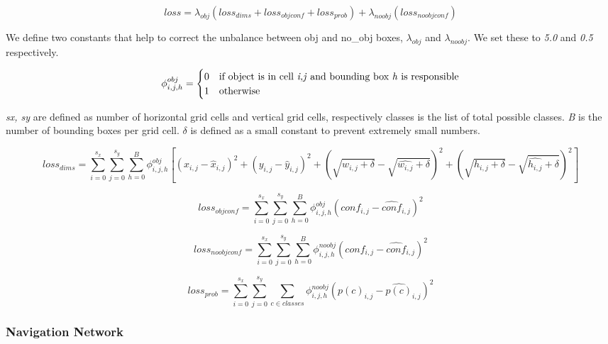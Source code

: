 \documentclass{article}
\begin{document}
\begin{equation}
loss = \lambda_{obj}(loss_{dims} + loss_{objconf}  + loss_{prob}) + \lambda_{noobj}(loss_{noobjconf})
\end{equation} 

We define two constants that help to correct the unbalance between obj and no\_obj boxes, $\lambda_{obj}$ and $\lambda_{noobj}$. We set these to \textit{5.0} and \textit{0.5} respectively.

\begin{equation}
\phi_{i,j,h}^{obj} =
\begin{cases}
0 & \text{if object is in cell \textit{i,j} and bounding box \textit{h} is responsible} \\
1 & \text{otherwise}
\end{cases}
\end{equation}

\textit{sx, sy} are defined as number of horizontal grid cells and vertical grid cells, respectively classes is the list of total possible classes. \textit{B} is the number of bounding boxes per grid cell. $\delta$ is defined as a small constant to prevent extremely small numbers.

\begin{equation}
loss_{dims} = \sum\limits_{i=0}^{s_x}\sum\limits_{j=0}^{s_y}\sum\limits_{h=0}^{B}\phi_{i,j,h}^{obj}[(x_{i,j} - \hat{x}_{i,j})^2 + (y_{i,j} - \hat{y}_{i,j})^2 + (\sqrt{w_{i,j} + \delta} - \sqrt{\hat{w_{i,j}} + \delta})^2 + (\sqrt{h_{i,j} + \delta} - \sqrt{\hat{h_{i,j}} + \delta})^2]
\end{equation}

\begin{equation}
loss_{objconf} = \sum\limits_{i=0}^{s_x}\sum\limits_{j=0}^{s_y}\sum\limits_{h=0}^{B}\phi_{i,j,h}^{obj}(conf_{i,j} - \hat{conf}_{i,j})^2
\end{equation}

\begin{equation}
loss_{noobjconf} = \sum\limits_{i=0}^{s_x}\sum\limits_{j=0}^{s_y}\sum\limits_{h=0}^{B}\phi_{i,j,h}^{noobj}(conf_{i,j} - \hat{conf}_{i,j})^2
\end{equation}

\begin{equation}
loss_{prob} = \sum\limits_{i=0}^{s_x}\sum\limits_{j=0}^{s_y}\sum\limits_{c\in classes}^{}\phi_{i,j,h}^{noobj}(p(c)_{i,j} - \hat{p(c)}_{i,j})^2
\end{equation}




\subsubsection{Navigation Network}
\end{document}
